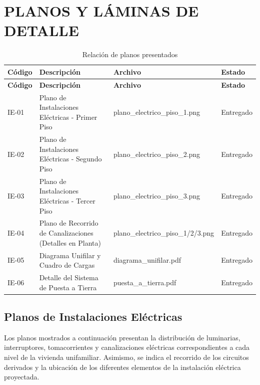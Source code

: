 
\chapter{PLANOS Y LÁMINAS DE DETALLE}

\begin{longtable}{L{1.6cm}L{5.5cm}L{4.5cm}L{2cm}}
	\caption{Relación de planos presentados}
	\label{tab:planos}\\
	
	\toprule
	\textbf{Código} & \textbf{Descripción} & \textbf{Archivo} & \textbf{Estado} \\
	\midrule
	\endfirsthead
	
	\toprule
	\textbf{Código} & \textbf{Descripción} & \textbf{Archivo} & \textbf{Estado} \\
	\midrule
	\endhead
	
	IE-01 &
	Plano de Instalaciones Eléctricas - Primer Piso &
	plano\_electrico\_piso\_1.png &
	Entregado \\
	
	IE-02 &
	Plano de Instalaciones Eléctricas - Segundo Piso &
	plano\_electrico\_piso\_2.png &
	Entregado \\
	
	IE-03 &
	Plano de Instalaciones Eléctricas - Tercer Piso &
	plano\_electrico\_piso\_3.png &
	Entregado \\
	
	IE-04 &
	Plano de Recorrido de Canalizaciones (Detalles en Planta) &
	plano\_electrico\_piso\_1/2/3.png &
	Entregado \\
	
	IE-05 &
	Diagrama Unifilar y Cuadro de Cargas &
	diagrama\_unifilar.pdf &
	Entregado \\
	
	IE-06 &
	Detalle del Sistema de Puesta a Tierra &
	puesta\_a\_tierra.pdf &
	Entregado \\
	
	\bottomrule
\end{longtable}

\section{Planos de Instalaciones Eléctricas}

Los planos mostrados a continuación presentan la distribución de luminarias, interruptores, tomacorrientes y canalizaciones eléctricas correspondientes a cada nivel de la vivienda unifamiliar. Asimismo, se indica el recorrido de los circuitos derivados y la ubicación de los diferentes elementos de la instalación eléctrica proyectada.

